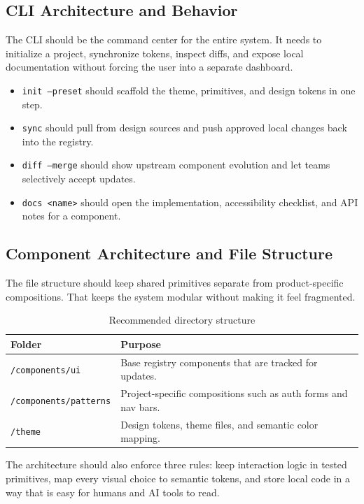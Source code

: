 \documentclass[11pt,twoside,a4paper]{article}
\begin{document}
\subsection{CLI Architecture and Behavior}
The CLI should be the command center for the entire system. It needs to initialize a project, synchronize tokens, inspect diffs, and expose local documentation without forcing the user into a separate dashboard.

\begin{itemize}[leftmargin=*, itemsep=0.35em]
  \item \texttt{init --preset} should scaffold the theme, primitives, and design tokens in one step.
  \item \texttt{sync} should pull from design sources and push approved local changes back into the registry.
  \item \texttt{diff --merge} should show upstream component evolution and let teams selectively accept updates.
  \item \texttt{docs <name>} should open the implementation, accessibility checklist, and API notes for a component.
\end{itemize}

\subsection{Component Architecture and File Structure}
The file structure should keep shared primitives separate from product-specific compositions. That keeps the system modular without making it feel fragmented.

\begin{table}[htbp]
  \centering
  \caption{Recommended directory structure}
  \begin{tabularx}{\textwidth}{@{}p{}Y@{}}
    \toprule
    \textbf{Folder} & \textbf{Purpose} \\
    \midrule
    \texttt{/components/ui} & Base registry components that are tracked for updates. \\
    \texttt{/components/patterns} & Project-specific compositions such as auth forms and nav bars. \\
    \texttt{/theme} & Design tokens, theme files, and semantic color mapping. \\
    \bottomrule
  \end{tabularx}
\end{table}

The architecture should also enforce three rules: keep interaction logic in tested primitives, map every visual choice to semantic tokens, and store local code in a way that is easy for humans and AI tools to read.
\end{document}
